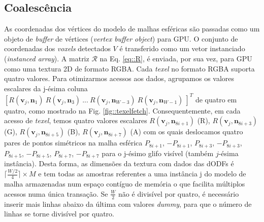 \subsection{Coalescência}
\label{ssec::coalescencia}


As coordenadas dos vértices do modelo de malhas esféricas são passadas como um objeto de \textit{buffer} de vértices (\textit{vertex buffer object}) para GPU. O conjunto de coordenadas dos \textit{voxels} detectados $V$ é transferido como um vetor instanciado (\textit{instanced array}). A matriz $\boldsymbol{\mathscr{R}}$ na Eq. \ref{eq::R}, é enviada, por sua vez, para GPU como uma textura 2D de formato RGBA. Cada \textit{texel} no formato RGBA suporta quatro valores. Para otimizarmos acessos aos dados, agrupamos os valores escalares da j-ésima coluna $[
R(\mathbf{v}_{j}, \mathbf{n}_1) ~
R(\mathbf{v}_{j}, \mathbf{n}_3) ~ ... ~
R(\mathbf{v}_{j}, \mathbf{n}_{W-3}) ~
R(\mathbf{v}_{j}, \mathbf{n}_{W-1}) ~
]^T$ de quatro em quatro, como mostrado na Fig. \ref{fig::texelfetch}. Consequentemente, em cada acesso de \textit{texel}, temos quatro valores escalares $
R(\mathbf{v}_{j}, \mathbf{\mathbf{n}}_{8i+1})$ (R), $
R(\mathbf{v}_{j}, \mathbf{\mathbf{n}}_{8i+3})$ (G), $
R(\mathbf{v}_{j}, \mathbf{\mathbf{n}}_{8i+5})$ (B), $
R(\mathbf{v}_{j}, \mathbf{\mathbf{n}}_{8i+7})$ (A) com os quais deslocamos quatro pares de pontos simétricos na malha esférica $P_{8i+1}$, $-P_{8i+1}$, $P_{8i+3}$, $-P_{8i+3}$, $P_{8i+5}$, $-P_{8i+5}$, $P_{8i+7}$, $-P_{8i+7}$ para o j-ésimo glifo visível (também $j$-ésima instância). Desta forma, as dimensões da textura com dados das dODFs é $ \lceil \frac{W/2}{4} \rceil \times M$ e tem todas as amostras referentes a uma instância j do modelo de malha armazenadas num espaço contíguo de memória o que facilita múltiplos acessos numa única transação. Se $\frac{W}{2}$ não é divisível por quatro, é necessário inserir mais linhas abaixo da última com valores \textit{dummy}, para que o número de linhas se torne divisível por quatro.

